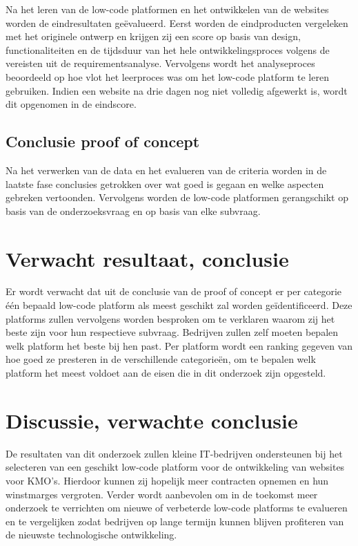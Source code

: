 Na het leren van de low-code platformen en het ontwikkelen van de websites worden de eindresultaten geëvalueerd. Eerst worden de eindproducten vergeleken met het originele ontwerp en krijgen zij een score op basis van design, functionaliteiten en de tijdsduur van het hele ontwikkelingsproces volgens de vereisten uit de requirementsanalyse. Vervolgens wordt het analyseproces beoordeeld op hoe vlot het leerproces was om het low-code platform te leren gebruiken. Indien een website na drie dagen nog niet volledig afgewerkt is, wordt dit opgenomen in de eindscore.

\subsection{Conclusie proof of concept}
\label{sec:Conclusie proof of concept}

Na het verwerken van de data en het evalueren van de criteria worden in de laatste fase conclusies getrokken over wat goed is gegaan en welke aspecten gebreken vertoonden. Vervolgens worden de low-code platformen gerangschikt op basis van de onderzoeksvraag en op basis van elke subvraag. 

\section{Verwacht resultaat, conclusie}%
\label{sec:verwachte_resultaten}
Er wordt verwacht dat uit de conclusie van de proof of concept er per categorie één bepaald low-code platform als meest geschikt zal worden geïdentificeerd. Deze platforms zullen vervolgens worden besproken om te verklaren waarom zij het beste zijn voor hun respectieve subvraag. Bedrijven zullen zelf moeten bepalen welk platform het beste bij hen past. Per platform wordt een ranking gegeven van hoe goed ze presteren in de verschillende categorieën, om te bepalen welk platform het meest voldoet aan de eisen die in dit onderzoek zijn opgesteld.

\section{Discussie, verwachte conclusie}
\label{sec:discussie-conclusie}

De resultaten van dit onderzoek zullen kleine IT-bedrijven ondersteunen bij het selecteren van een geschikt low-code platform voor de ontwikkeling van websites voor KMO's. Hierdoor kunnen zij hopelijk meer contracten opnemen en hun winstmarges vergroten. Verder wordt aanbevolen om in de toekomst meer onderzoek te verrichten om nieuwe of verbeterde low-code platforms te evalueren en te vergelijken zodat bedrijven op lange termijn kunnen blijven profiteren van de nieuwste technologische ontwikkeling. 
